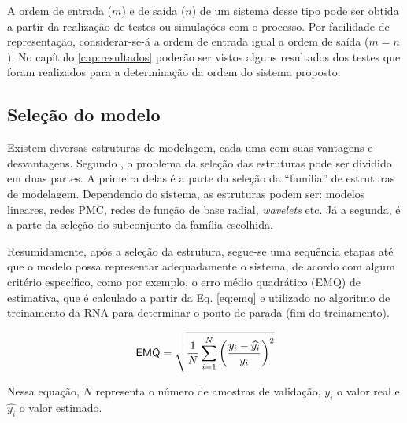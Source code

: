 A ordem de entrada ($m$) e de saída ($n$) de um sistema desse tipo pode ser
obtida a partir da realização de testes ou simulações com o processo. Por
facilidade de representação, considerar-se-á a ordem de entrada igual a ordem de
saída ($m = n$). No capítulo \ref{cap:resultados} poderão ser vistos alguns
resultados dos testes que foram realizados para a determinação da ordem do
sistema proposto.

\subsection{Seleção do modelo}
Existem diversas estruturas de modelagem, cada uma com suas vantagens e
desvantagens. Segundo , o problema da seleção das
estruturas pode ser dividido em duas partes. A primeira delas é a parte da
seleção da ``família'' de estruturas de modelagem. Dependendo do sistema, as
estruturas podem ser: modelos lineares, redes PMC, redes de função de base
radial, {\it wavelets} etc. Já a segunda, é a parte da seleção do subconjunto da
família escolhida.

Resumidamente, após a seleção da estrutura, segue-se uma sequência etapas até
que o modelo possa representar adequadamente o sistema, de acordo com algum
critério específico, como por exemplo, o erro médio quadrático (EMQ) de
estimativa, que é calculado a partir da Eq. \ref{eq:emq} e utilizado no
algoritmo de treinamento da RNA para determinar o ponto de parada (fim do
treinamento).


\begin{equation}\label{eq:emq}
\textsf{EMQ} = \sqrt{\frac{1}{N}
               \sum_{i=1}^{N}\left(\frac{y_i - \widehat{y_i}}{y_i}\right)^2}
\end{equation}

Nessa equação, $N$ representa o número de amostras de validação, $y_i$ o valor
real e $\widehat{y_i}$ o valor estimado.

